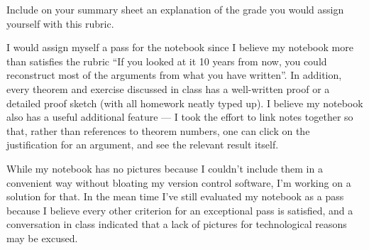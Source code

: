 \documentclass[12 pt, letterpaper]{hmcpset}
\begin{document}
\begin{problem}
	Include on your summary sheet an explanation of the grade you would assign yourself with this rubric.
\end{problem}

\begin{solution}
	I would assign myself a pass for the notebook since I believe my notebook more than satisfies the rubric ``If you looked at it 10 years from now, you could reconstruct most of the arguments from what you have written''. In addition, every theorem and exercise discussed in class has a well-written proof or a detailed proof sketch (with all homework neatly typed up). I believe my notebook also has a useful additional feature --- I took the effort to link notes together so that, rather than references to theorem numbers, one can click on the justification for an argument, and see the relevant result itself.

	While my notebook has no pictures because I couldn't include them in a convenient way without bloating my version control software, I'm working on a solution for that. In the mean time I've still evaluated my notebook as a pass because I believe every other criterion for an exceptional pass is satisfied, and a conversation in class indicated that a lack of pictures for technological reasons may be excused.
\end{solution}
\end{document}
